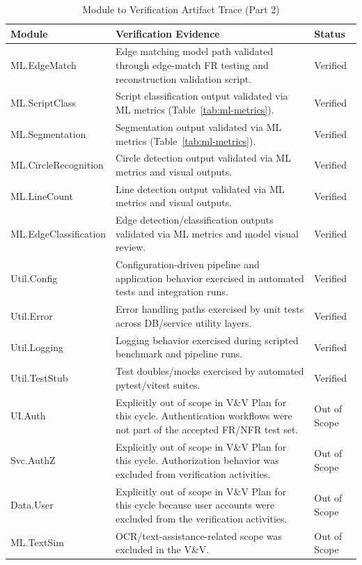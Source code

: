 \documentclass[12pt, titlepage]{article}
\begin{document}
\begin{table}[H]
\centering
\scriptsize
\setlength{\tabcolsep}{2pt}
\renewcommand{\arraystretch}{1.0}
\caption{Module to Verification Artifact Trace (Part 2)}
\begin{tabularx}{\textwidth}{p{3.3cm}X p{1.1cm}}
\toprule
\textbf{Module} & \textbf{Verification Evidence} & \textbf{Status}\\
\midrule
ML.EdgeMatch & Edge matching model path validated through edge-match FR testing and reconstruction validation script. & Verified\\
ML.ScriptClass & Script classification output validated via ML metrics (Table~\ref{tab:ml-metrics}). & Verified\\
ML.Segmentation & Segmentation output validated via ML metrics (Table~\ref{tab:ml-metrics}). & Verified\\
ML.CircleRecognition & Circle detection output validated via ML metrics and visual outputs. & Verified\\
ML.LineCount & Line detection output validated via ML metrics and visual outputs. & Verified\\
ML.EdgeClassification & Edge detection/classification outputs validated via ML metrics and model visual review. & Verified\\
Util.Config & Configuration-driven pipeline and application behavior exercised in automated tests and integration runs. & Verified\\
Util.Error & Error handling paths exercised by unit tests across DB/service utility layers. & Verified\\
Util.Logging & Logging behavior exercised during scripted benchmark and pipeline runs. & Verified\\
Util.TestStub & Test doubles/mocks exercised by automated pytest/vitest suites. & Verified\\
UI.Auth & Explicitly out of scope in V\&V Plan for this cycle. Authentication workflows were not part of the accepted FR/NFR test set. & Out of Scope\\
Svc.AuthZ & Explicitly out of scope in V\&V Plan for this cycle. Authorization behavior was excluded from verification activities. & Out of Scope\\
Data.User & Explicitly out of scope in V\&V Plan for this cycle because user accounts were excluded from the verification activities. & Out of Scope\\
ML.TextSim & OCR/text-assistance-related scope was excluded in the V\&V. & Out of Scope\\
\bottomrule
\end{tabularx}
\end{table}
\end{document}
